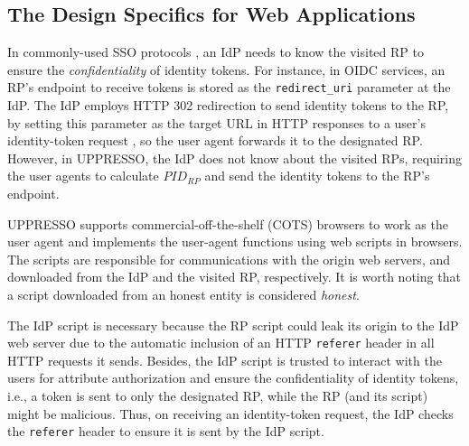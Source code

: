 \subsection{The Design Specifics for Web Applications}
\label{sec:web-design}

In commonly-used SSO protocols \cite{OpenIDConnect,rfc6749, SAML, SAMLIdentifier},
an IdP needs to know the visited RP to ensure the \emph{confidentiality} of identity tokens.
 For instance, in OIDC services,
 an RP's endpoint to receive tokens is stored as the \verb+redirect_uri+ parameter at the IdP.
The IdP employs HTTP 302 redirection to send identity tokens to the RP,
            by setting this parameter as the target URL in HTTP responses to a user's identity-token request \cite{OpenIDConnect},
so the user agent forwards it to the designated RP.
However, in UPPRESSO, the IdP does not know about the visited RPs, requiring the user agents to calculate $PID_{RP}$ and send the identity tokens to the RP's endpoint.

UPPRESSO supports commercial-off-the-shelf (COTS) browsers to work as the user agent
 and implements the user-agent functions using web scripts in browsers.
 The scripts are responsible for communications with the origin web servers, and
  downloaded from the IdP and the visited RP, respectively.
It is worth noting that a script downloaded from an honest entity is considered \emph{honest}.

The IdP script is necessary because the RP script could leak its origin to the IdP web server due to the automatic inclusion of an HTTP \verb+referer+ header in all HTTP requests it sends.
Besides, the IdP script is trusted to interact with the users for attribute authorization and ensure the confidentiality of identity tokens, i.e., a token is sent to only the designated RP, while the RP (and its script) might be malicious. Thus, on receiving an identity-token request, the IdP checks the \verb+referer+ header to ensure it is sent by the IdP script.

